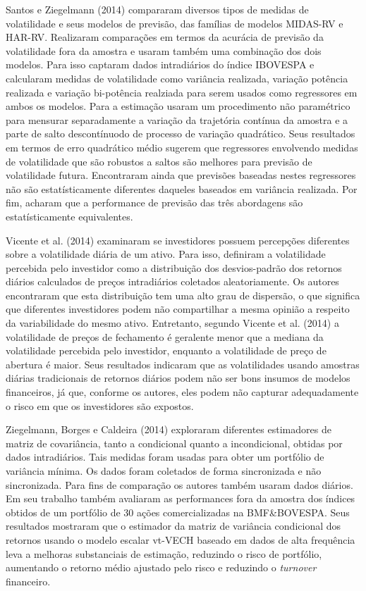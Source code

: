 \documentclass[]{article}
\begin{document}
Santos e Ziegelmann (2014) compararam diversos tipos de medidas de
volatilidade e seus modelos de previsão, das famílias de modelos
MIDAS-RV e HAR-RV. Realizaram comparações em termos da acurácia de
previsão da volatilidade fora da amostra e usaram também uma combinação
dos dois modelos. Para isso captaram dados intradiários do índice
IBOVESPA e calcularam medidas de volatilidade como variância realizada,
variação potência realizada e variação bi-potência realziada para serem
usados como regressores em ambos os modelos. Para a estimação usaram um
procedimento não paramétrico para mensurar separadamente a variação da
trajetória contínua da amostra e a parte de salto descontínuodo de
processo de variação quadrático. Seus resultados em termos de erro
quadrático médio sugerem que regressores envolvendo medidas de
volatilidade que são robustos a saltos são melhores para previsão de
volatilidade futura. Encontraram ainda que previsões baseadas nestes
regressores não são estatísticamente diferentes daqueles baseados em
variância realizada. Por fim, acharam que a performance de previsão das
três abordagens são estatísticamente equivalentes.

Vicente et al. (2014) examinaram se investidores possuem percepções
diferentes sobre a volatilidade diária de um ativo. Para isso, definiram
a volatilidade percebida pelo investidor como a distribuição dos
desvios-padrão dos retornos diários calculados de preços intradiários
coletados aleatoriamente. Os autores encontraram que esta distribuição
tem uma alto grau de dispersão, o que significa que diferentes
investidores podem não compartilhar a mesma opinião a respeito da
variabilidade do mesmo ativo. Entretanto, segundo Vicente et al. (2014)
a volatilidade de preços de fechamento é geralente menor que a mediana
da volatilidade percebida pelo investidor, enquanto a volatilidade de
preço de abertura é maior. Seus resultados indicaram que as
volatilidades usando amostras diárias tradicionais de retornos diários
podem não ser bons insumos de modelos financeiros, já que, conforme os
autores, eles podem não capturar adequadamente o risco em que os
investidores são expostos.

Ziegelmann, Borges e Caldeira (2014) exploraram diferentes estimadores
de matriz de covariância, tanto a condicional quanto a incondicional,
obtidas por dados intradiários. Tais medidas foram usadas para obter um
portfólio de variância mínima. Os dados foram coletados de forma
sincronizada e não sincronizada. Para fins de comparação os autores
também usaram dados diários. Em seu trabalho também avaliaram as
performances fora da amostra dos índices obtidos de um portfólio de 30
ações comercializadas na BMF\&BOVESPA. Seus resultados mostraram que o
estimador da matriz de variância condicional dos retornos usando o
modelo escalar vt-VECH baseado em dados de alta frequência leva a
melhoras substanciais de estimação, reduzindo o risco de portfólio,
aumentando o retorno médio ajustado pelo risco e reduzindo o
\emph{turnover} financeiro.
\end{document}
